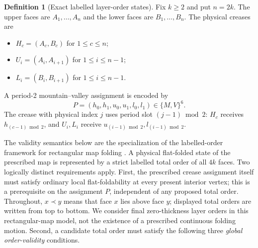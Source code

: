 \documentclass[11pt]{article}
\theoremstyle{definition}
\newtheorem{definition}[theorem]{Definition}
\theoremstyle{remark}
\providecommand{\tightlist}{\setlength{\itemsep}{0pt}\setlength{\parskip}{0pt}}
\begin{document}
\begin{definition}[Exact labelled layer-order states]\label{obj:D1}
Fix \(k\ge2\) and put \(n=2k\). The upper faces are \(A_1,\ldots,A_n\)
and the lower faces are \(B_1,\ldots,B_n\). The physical creases are

\begin{itemize}
\tightlist
\item
  \(H_c=(A_c,B_c)\) for \(1\le c\le n\);
\item
  \(U_i=(A_i,A_{i+1})\) for \(1\le i\le n-1\);
\item
  \(L_i=(B_i,B_{i+1})\) for \(1\le i\le n-1\).
\end{itemize}

A period-2 mountain--valley assignment is encoded by \[
P=(h_0,h_1,u_0,u_1,l_0,l_1)\in\{M,V\}^6.
\] The crease with physical index \(j\) uses period slot
\((j-1)\bmod2\): \(H_c\) receives \(h_{(c-1)\bmod2}\), and \(U_i,L_i\)
receive \(u_{(i-1)\bmod2},l_{(i-1)\bmod2}\).

The validity semantics below are the specialization of the
labelled-order framework for rectangular map folding \cite{Nishat2013,NishatWhitesides2013}. A physical flat-folded state of the prescribed map is represented by a strict labelled total order of all \(4k\) faces. Two logically distinct requirements apply. First, the prescribed crease assignment itself must satisfy ordinary local flat-foldability at every present interior vertex; this is a prerequisite on the assignment \(P\), independent of any proposed total order. Throughout, $x\prec y$ means that face $x$ lies above face $y$; displayed total orders are written from top to bottom. We consider final zero-thickness layer orders in this rectangular-map model, not the existence of a prescribed continuous folding motion. Second, a candidate total order must satisfy the following three \emph{global order-validity} conditions.


\end{definition}
\end{document}
